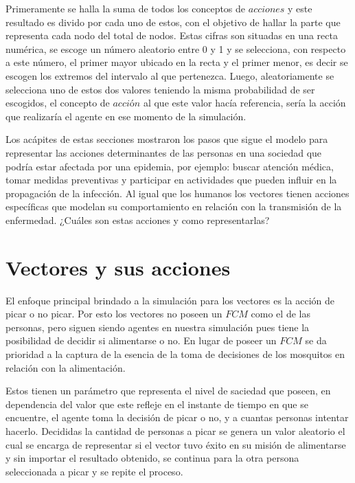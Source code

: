 Primeramente se halla la suma de todos los conceptos de $acciones$ y este resultado es divido por cada uno de 
estos, con el objetivo de hallar la parte que representa cada nodo del total de nodos. Estas cifras son
situadas en una recta numérica, se escoge un número aleatorio entre 0 y 1 y se selecciona, con respecto 
a este número, el primer mayor ubicado en la recta y el primer menor, es decir se escogen los extremos
del intervalo al que pertenezca. Luego, aleatoriamente se selecciona uno de estos dos valores teniendo
la misma probabilidad de ser escogidos, el concepto de $acci$ó$n$ al que este valor hacía referencia, sería
la acción que realizaría el agente en ese momento de la simulación.

Los acápites de estas secciones mostraron los pasos que sigue el modelo para representar las acciones
determinantes de las personas en una sociedad que podría estar afectada por una epidemia, por ejemplo: buscar 
atención médica, tomar medidas preventivas y participar en actividades que pueden influir en la propagación 
de la infección. Al igual que los humanos los vectores tienen acciones específicas que modelan su 
comportamiento en relación con la transmisión de la enfermedad. ¿Cuáles son estas acciones y como representarlas?



\section{Vectores y sus acciones}
El enfoque principal brindado a la simulación para los vectores es la acción de picar o no picar. Por esto
los vectores no poseen un $FCM$ como el de las personas, pero siguen siendo agentes en nuestra simulación
pues tiene la posibilidad de decidir si alimentarse o no. En lugar de poseer un $FCM$ se da prioridad a la 
captura de la esencia de la toma de decisiones de los mosquitos en relación con la alimentación.

Estos tienen un parámetro que representa el nivel de saciedad que poseen, en dependencia del valor que este
refleje en el instante de tiempo en que se encuentre, el agente toma la decisión de picar o no, y a cuantas 
personas intentar hacerlo. Decididas la cantidad de personas a picar se genera un valor aleatorio el cual 
se encarga de representar si el vector tuvo éxito en su misión de alimentarse y sin importar el resultado 
obtenido, se continua para la otra persona seleccionada a picar y se repite el proceso.

